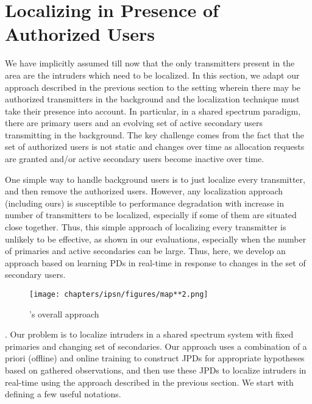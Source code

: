 \section{\texorpdfstring{\ouralgoss}: Localizing in Presence of Authorized Users}
\label{sec:auth}
\label{sec:mtlss}

We have implicitly assumed till now that the only transmitters present
in the area are the intruders which need to be localized.  In this
section, we adapt our \ouralgo approach described in the previous
section to the setting wherein there may be authorized transmitters in
the background and the localization technique must take their presence
into account. In particular, in a shared spectrum paradigm, there are
primary users and an evolving set of active secondary users
transmitting in the background. The key challenge comes from the fact
that the set of authorized users is not static and changes over time
as allocation requests are granted and/or active secondary users
become inactive over time.

One simple way to handle background users is to just localize every
transmitter, and then remove the authorized users. However, any
localization approach (including ours) is susceptible to performance
degradation with increase in number of transmitters to be localized,
especially if some of them are situated close together. Thus, this
simple approach of localizing every transmitter is unlikely to be
effective, as shown in our evaluations, especially when the number of
primaries and active secondaries can be large. Thus, here, we develop
an approach based on learning PDs in real-time in response to changes
in the set of secondary users.

\begin{figure}
	\centering
	\texttt{[image: chapters/ipsn/figures/map**2.png]}
	\caption{\ouralgoss's overall approach}
	\label{fig:auth}
\end{figure}

. Our problem
is to localize intruders in a shared spectrum system with fixed
primaries and changing set of secondaries.  Our \ouralgoss approach
uses a combination of a priori (offline) and online training to
construct JPDs for appropriate hypotheses based on gathered
observations, and then use these JPDs to localize intruders in
real-time using the \ouralgo approach described in the previous
section. We start with defining a few useful notations.

